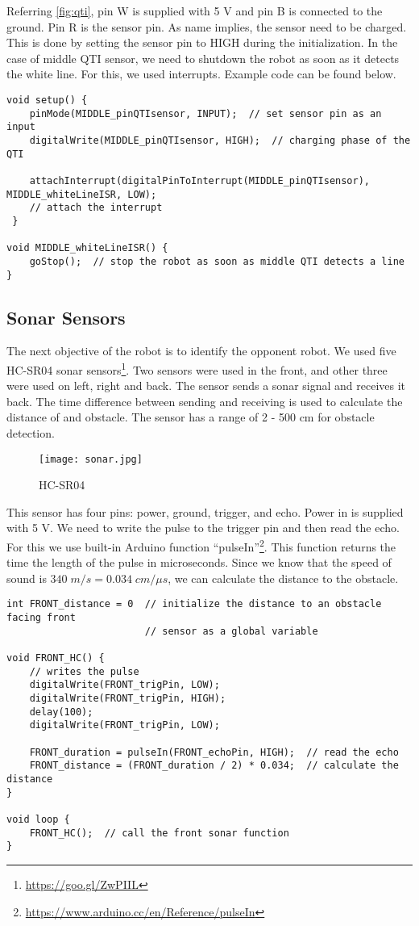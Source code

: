 \documentclass[11pt, letterpaper, oneside]{article}
\begin{document}
Referring \cref{fig:qti}, pin W is supplied with 5 V and pin B is connected to the ground. Pin R is the sensor pin. As name implies, the sensor need to be charged. This is done by setting the sensor pin to HIGH during the initialization. In the case of middle QTI sensor, we need to shutdown the robot as soon as it detects the white line. For this, we used interrupts. Example code can be found below.

\begin{verbatim}
void setup() {
    pinMode(MIDDLE_pinQTIsensor, INPUT);  // set sensor pin as an input
    digitalWrite(MIDDLE_pinQTIsensor, HIGH);  // charging phase of the QTI
	
    attachInterrupt(digitalPinToInterrupt(MIDDLE_pinQTIsensor), MIDDLE_whiteLineISR, LOW);
    // attach the interrupt 
 }
 
void MIDDLE_whiteLineISR() {
    goStop();  // stop the robot as soon as middle QTI detects a line
}
\end{verbatim}


\subsection{Sonar Sensors}
The next objective of the robot is to identify the opponent robot. We used five HC-SR04 sonar sensors\footnote{\url{https://goo.gl/ZwPIIL}}. Two sensors were used in the front, and other three were used on left, right and back. The sensor sends a sonar signal and receives it back. The time difference between sending and receiving is used to calculate the distance of and obstacle. The sensor has a range of 2 - 500 cm for obstacle detection.
\begin{figure}[bth]
	\begin{center}
		\texttt{[image: sonar.jpg]}
		\caption{HC-SR04}
		\label{fig:sonar}
	\end{center}
\end{figure}

This sensor has four pins: power, ground, trigger, and echo. Power in is supplied with 5 V. We need to write the pulse to the trigger pin and then read the echo. For this we use built-in Arduino function ``pulseIn''\footnote{\url{https://www.arduino.cc/en/Reference/pulseIn}}. This function returns the time the length of the pulse in microseconds. Since we know that the speed of sound is $340 \; m/s = 0.034 \; cm / \mu s$, we can calculate the distance to the obstacle.

\begin{verbatim}
int FRONT_distance = 0  // initialize the distance to an obstacle facing front 
                        // sensor as a global variable

void FRONT_HC() {
    // writes the pulse
    digitalWrite(FRONT_trigPin, LOW);
    digitalWrite(FRONT_trigPin, HIGH);
    delay(100);                      
    digitalWrite(FRONT_trigPin, LOW);
    
    FRONT_duration = pulseIn(FRONT_echoPin, HIGH);  // read the echo
    FRONT_distance = (FRONT_duration / 2) * 0.034;  // calculate the distance
}

void loop {
    FRONT_HC();  // call the front sonar function
}
\end{verbatim}
\end{document}
